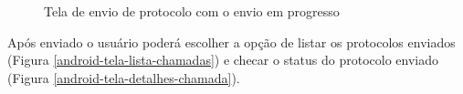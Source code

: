 \documentclass[
	article,			%
	11pt,				%
	oneside,			%
	a4paper,			%
	english,			%
	brazil,				%
	sumario=tradicional
	]{abntex2}
\begin{document}
\begin{figure}[!htbp]
\begin{minipage}{0.4\textwidth}
    \centering
    \caption{\label{android-tela-enviando}Tela de envio de protocolo com o envio em progresso}
  \end{minipage}
\end{figure}

Após enviado o usuário poderá escolher a opção de listar os protocolos enviados (Figura \ref{android-tela-lista-chamadas}) e checar o status do protocolo enviado (Figura \ref{android-tela-detalhes-chamada}).
\end{document}
